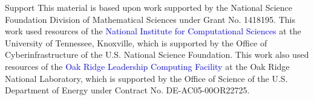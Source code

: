 \begin{frame}[noframenumbering]
\begin{block}{Support}\tiny
  This material is based upon work supported by the National Science
  Foundation Division of Mathematical Sciences under Grant No. 1418195.
  This work used resources of the \textcolor{blue}{National Institute for
  Computational Sciences} at the University of Tennessee, Knoxville,
  which is supported by the Office of Cyberinfrastructure of the
  U.S. National Science Foundation.
  This work also used resources of the \textcolor{blue}{Oak Ridge
  Leadership Computing Facility} at the Oak Ridge National
  Laboratory, which is supported by the Office of Science of the
  U.S. Department of Energy under Contract No. DE-AC05-00OR22725.\\[.2cm]
\end{block}
\end{frame}

\setcounter{framenumber}{0}
